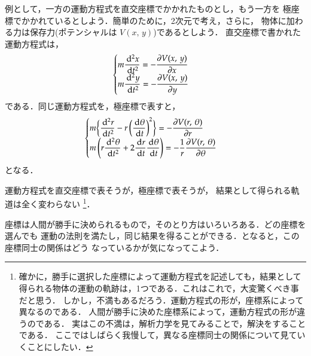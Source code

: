                 例として，一方の運動方程式を直交座標でかかれたものとし，もう一方を
                極座標でかかれているとしよう．簡単のために，2次元で考え，さらに，
                物体に加わる力は保存力(ポテンシャルは $V(x,\,y)$)であるとしよう．
                直交座標で書かれた運動方程式は，
                    \begin{align}
                        \begin{cases}
                            \displaystyle m\frac{\,\mathrm{d}^{2} x}{\,\mathrm{d} t^{2}} = -\frac{\partial V(x,\,y)}{\partial x} \\
                            \displaystyle m\frac{\,\mathrm{d}^{2} y}{\,\mathrm{d} t^{2}} = -\frac{\partial V(x,\,y)}{\partial y}
                        \end{cases}
                    \end{align}
                である．同じ運動方程式を，極座標で表すと，
                    \begin{align}
                        \begin{cases}
                            \displaystyle m\biggl\{ \frac{\,\mathrm{d}^{2} r }{\,\mathrm{d} t^{2}}  - r\left( \frac{\,\mathrm{d} \theta}{\,\mathrm{d} t} \right)^{2} \biggr\}
                                    = -\frac{\partial V(r,\,\theta)}{\partial r} \\
                            \displaystyle m\left( r\frac{\,\mathrm{d}^{2} \theta }{\,\mathrm{d} t^{2}} + 2\frac{\,\mathrm{d} r}{\,\mathrm{d} t}\frac{\,\mathrm{d} \theta}{\,\mathrm{d} t} \right)
                                    = -\frac{1}{r}\frac{\partial V(r,\,\theta)}{\partial \theta}
                        \end{cases}
                    \end{align}
                となる．

                運動方程式を直交座標で表そうが，極座標で表そうが，
                結果として得られる軌道は全く変わらない
                    \footnote{
                        確かに，勝手に選択した座標によって運動方程式を記述しても，結果として
                        得られる物体の運動の軌跡は，1つである．これはこれで，大変驚くべき事だと思う．
                        しかし，不満もあるだろう．運動方程式の形が，座標系によって異なるのである．
                        人間が勝手に決めた座標系によって，運動方程式の形が違うのである．
                        実はこの不満は，解析力学を見てみることで，解決をすることである．
                        ここではしばらく我慢して，異なる座標同士の関係について見ていくことにしたい．
                    }．

                座標は人間が勝手に決められるもので，そのとり方はいろいろある．どの座標を選んでも
                運動の法則を満たし，同じ結果を得ることができる．となると，この座標同士の関係はどう
                なっているかが気になってこよう．

